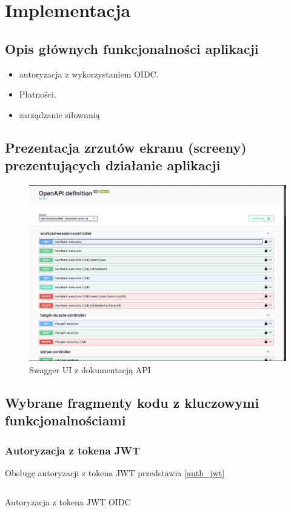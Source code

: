 \documentclass[../../spr.tex]{subfiles}
\begin{document}
\section{Implementacja}

\subsection{Opis głównych funkcjonalności aplikacji}

\begin{itemize}
  \item autoryzacja z wykorzystaniem OIDC.
  \item Płatności.
  \item zarządzanie siłownnią
\end{itemize}

\subsection{Prezentacja zrzutów ekranu (screeny) prezentujących działanie aplikacji}
\begin{figure}[H]
  \centering
  \includegraphics[width=\textwidth]{swagger.png}
  \caption{Swagger UI z dokumentacją API}
\end{figure}

\subsection{Wybrane fragmenty kodu z kluczowymi funkcjonalnościami}


\subsubsection{Autoryzacja z tokena JWT}

Obsługę autoryzacji z tokena JWT przedstawia \cref{auth_jwt}

\begin{listing}
  \inputminted[breaklines, fontsize=\footnotesize, breakanywhere, firstline=18, numbers=left]
  {java}{./sections/implementacja/GymJwtAuthenticationConverter.java}
  \caption{Autoryzacja z tokena JWT OIDC}
  \label{auth_jwt}
\end{listing}

\subsubsection{}
\end{document}
